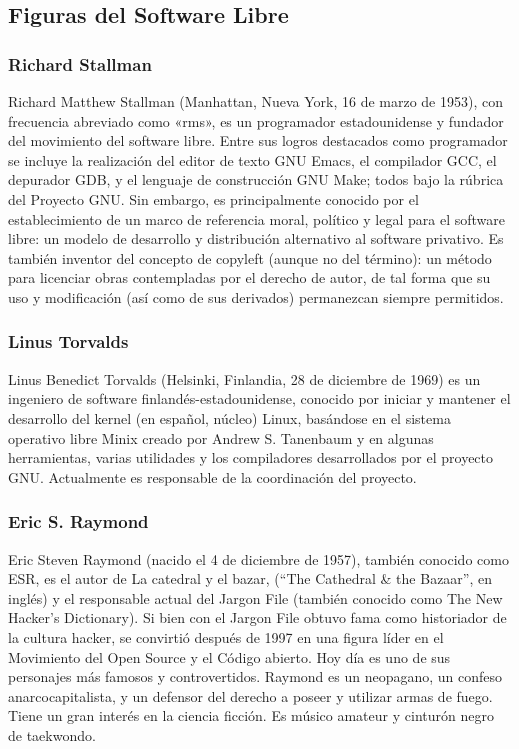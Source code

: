 \subsection{Figuras del Software Libre}

\subsubsection{Richard Stallman}
Richard Matthew Stallman (Manhattan, Nueva York, 16 de marzo de 1953), con frecuencia abreviado como «rms», es un programador estadounidense y fundador del movimiento del software libre.
Entre sus logros destacados como programador se incluye la realización del editor de texto GNU Emacs, el compilador GCC, el depurador GDB, y el lenguaje de construcción GNU Make; todos bajo la rúbrica del Proyecto GNU. Sin embargo, es principalmente conocido por el establecimiento de un marco de referencia moral, político y legal para el software libre: un modelo de desarrollo y distribución alternativo al software privativo. Es también inventor del concepto de copyleft (aunque no del término): un método para licenciar obras contempladas por el derecho de autor, de tal forma que su uso y modificación (así como de sus derivados) permanezcan siempre permitidos.

\subsubsection{Linus Torvalds}
Linus Benedict Torvalds (Helsinki, Finlandia, 28 de diciembre de 1969) es un ingeniero de software finlandés-estadounidense, conocido por iniciar y mantener el desarrollo del kernel (en español, núcleo) Linux, basándose en el sistema operativo libre Minix creado por Andrew S. Tanenbaum y en algunas herramientas, varias utilidades y los compiladores desarrollados por el proyecto GNU. Actualmente es responsable de la coordinación del proyecto.

\subsubsection{Eric S. Raymond}
Eric Steven Raymond (nacido el 4 de diciembre de 1957), también conocido como ESR, es el autor de La catedral y el bazar, (``The Cathedral \& the Bazaar'', en inglés) y el responsable actual del Jargon File (también conocido como The New Hacker's Dictionary). Si bien con el Jargon File obtuvo fama como historiador de la cultura hacker, se convirtió después de 1997 en una figura líder en el Movimiento del Open Source y el Código abierto. Hoy día es uno de sus personajes más famosos y controvertidos.
Raymond es un neopagano, un confeso anarcocapitalista, y un defensor del derecho a poseer y utilizar armas de fuego. Tiene un gran interés en la ciencia ficción. Es músico amateur y cinturón negro de taekwondo.

